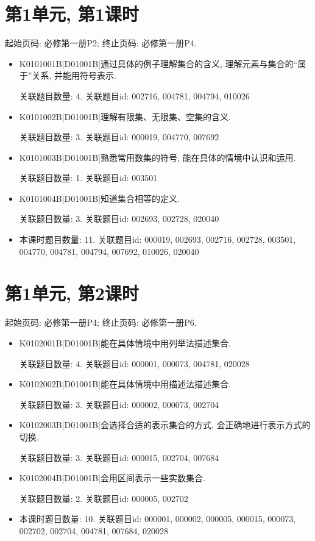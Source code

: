 \section*{第1单元, 第1课时}
起始页码: 必修第一册P2; 终止页码: 必修第一册P4.
\begin{itemize}
\item K0101001B|D01001B|通过具体的例子理解集合的含义, 理解元素与集合的``属于''关系, 并能用符号表示.

关联题目数量: 4. 关联题目id: 002716, 004781, 004794, 010026

\item K0101002B|D01001B|理解有限集、无限集、空集的含义.

关联题目数量: 3. 关联题目id: 000019, 004770, 007692

\item K0101003B|D01001B|熟悉常用数集的符号, 能在具体的情境中认识和运用.

关联题目数量: 1. 关联题目id: 003501

\item K0101004B|D01001B|知道集合相等的定义.

关联题目数量: 3. 关联题目id: 002693, 002728, 020040

\item 本课时题目数量: 11. 关联题目id: 000019, 002693, 002716, 002728, 003501, 004770, 004781, 004794, 007692, 010026, 020040

\end{itemize}

\section*{第1单元, 第2课时}
起始页码: 必修第一册P4; 终止页码: 必修第一册P6.
\begin{itemize}
\item K0102001B|D01001B|能在具体情境中用列举法描述集合.

关联题目数量: 4. 关联题目id: 000001, 000073, 004781, 020028

\item K0102002B|D01001B|能在具体情境中用描述法描述集合.

关联题目数量: 3. 关联题目id: 000002, 000073, 002704

\item K0102003B|D01001B|会选择合适的表示集合的方式, 会正确地进行表示方式的切换.

关联题目数量: 3. 关联题目id: 000015, 002704, 007684

\item K0102004B|D01001B|会用区间表示一些实数集合.

关联题目数量: 2. 关联题目id: 000005, 002702

\item 本课时题目数量: 10. 关联题目id: 000001, 000002, 000005, 000015, 000073, 002702, 002704, 004781, 007684, 020028

\end{itemize}

